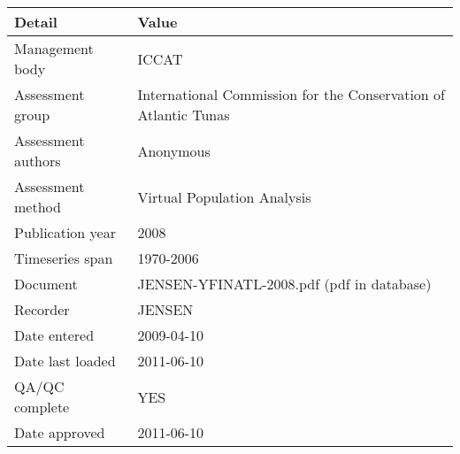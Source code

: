\begin{table}[htb]
\centering
\begin{tabular}{lp{7cm}}
\toprule
Detail & Value \\
\midrule
Management body    & ICCAT                                                           \\
Assessment group   & International Commission for the Conservation of Atlantic Tunas \\
Assessment authors & Anonymous                                                       \\
Assessment method  & Virtual Population Analysis                                     \\
Publication year   & 2008                                                            \\
Timeseries span    & 1970-2006                                                       \\
Document           & JENSEN-YFINATL-2008.pdf (pdf in database)                       \\
Recorder           & JENSEN                                                          \\
Date entered       & 2009-04-10                                                      \\
Date last loaded   & 2011-06-10                                                      \\
QA/QC complete     & YES                                                             \\
Date approved      & 2011-06-10                                                      \\
\bottomrule
\end{tabular}
\label{tab:assessdet}
\end{table}
